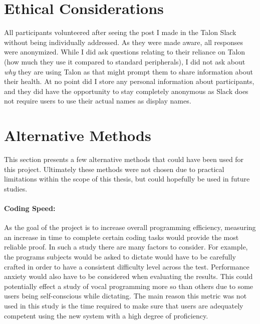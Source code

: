 \documentclass[../thesis.tex]{subfiles}
\begin{document}
\section{Ethical Considerations}%
\label{sec:ethical_considerations}
All participants volunteered after seeing the post I made in the Talon Slack without being individually addressed.
As they were made aware, all responses were anonymized. %
While I did ask questions relating to their reliance on Talon (how much they use it compared to standard peripherals), 
I did not ask about \textit{why} they are using Talon as that might prompt them to share information about their health.
At no point did I store any personal information about participants, and they did have the opportunity to stay completely anonymous
as Slack does not require users to use their actual names as display names.



\section{Alternative Methods}\label{alternative_methods}
This section presents a few alternative methods that could have been used for this project.
Ultimately these methods were not chosen due to practical limitations within the scope of this thesis,
but could hopefully be used in future studies.
\paragraph{Coding Speed:}
As the goal of the project is to increase overall programming efficiency, measuring an increase in time to complete
certain coding tasks would provide the most reliable proof.
In such a study there are many factors to consider.
For example, the programs subjects would be asked to dictate would have to be carefully crafted in order to have a consistent difficulty level across the test.
Performance anxiety would also have to be considered when evaluating the results.
This could potentially effect a study of vocal programming more so than others due to some users being self-conscious while dictating.
The main reason this metric was not used in this study is the time required to make sure that users
are adequately competent using the new system with a high degree of proficiency.

\end{document}
